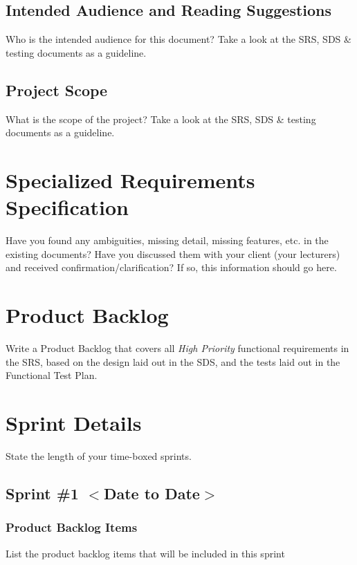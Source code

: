 \documentclass{scrreprt}
\begin{document}
% 
% 
\section{Intended Audience and Reading Suggestions}

Who is the intended audience for this document? Take a look at the SRS, SDS \& testing documents as a guideline.

% 
% 
\section{Project Scope}

What is the scope of the project? Take a look at the SRS, SDS \& testing documents as a guideline. 


% 
% 
% 
\chapter{Specialized Requirements Specification}

Have you found any ambiguities, missing detail, missing features, etc. in the existing documents? Have you discussed them with your client (your lecturers) and received confirmation/clarification? If so, this information should go here. 


% 
% 
% 
\chapter{Product Backlog}

Write a Product Backlog that covers all \textit{High Priority} functional requirements in the SRS, based on the design laid out in the SDS, and the tests laid out in the Functional Test Plan.



% 
% 
% 
\chapter{Sprint Details}

State the length of your time-boxed sprints. 

% 
% 
\section{Sprint \#1 $<$Date to Date$>$}

% 
\subsection{Product Backlog Items}
List the product backlog items that will be included in this sprint
\end{document}
